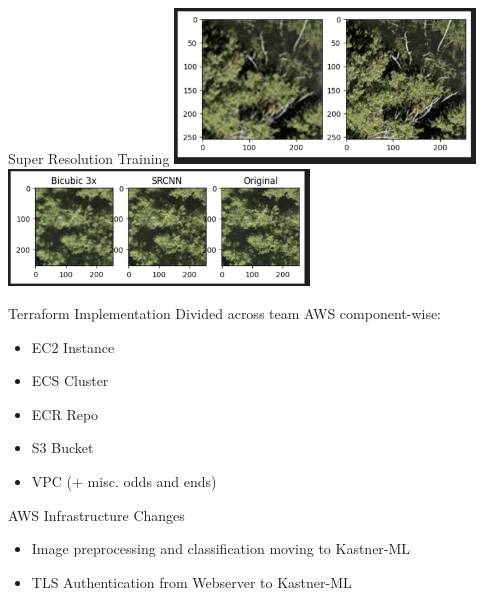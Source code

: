 \begin{frame}{Super Resolution Training}
    \centering
    \includegraphics[height=0.5\textheight,width=0.6\textwidth,keepaspectratio]{images/Artificial_Downsample.png}
    \includegraphics[height=0.5\textheight,width=0.6\textwidth,keepaspectratio]{images/Upsample_compare.png}
\end{frame}

\begin{frame}{Terraform Implementation}
    Divided across team AWS component-wise:
    \begin{itemize}
        \item EC2 Instance
        \item ECS Cluster
        \item ECR Repo
        \item S3 Bucket
        \item VPC (+ misc. odds and ends)
    \end{itemize}
\end{frame}

\begin{frame}{AWS Infrastructure Changes}
    \begin{itemize}
        \item Image preprocessing and classification moving to Kastner-ML
        \item TLS Authentication from Webserver to Kastner-ML
    \end{itemize}
\end{frame}



